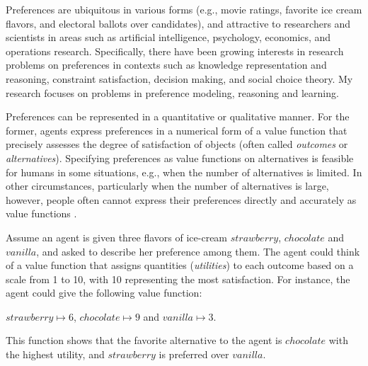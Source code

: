 Preferences are ubiquitous in various forms (e.g., movie ratings, 
favorite ice cream flavors, and electoral ballots over candidates),
and attractive to researchers and scientists in areas such as 
artificial intelligence, psychology, economics, and operations research.
Specifically, there have been growing interests in research problems on
preferences in contexts such as knowledge representation and reasoning, constraint 
satisfaction, decision making, and social choice theory. 
My research focuses on problems in preference modeling, 
reasoning and learning.

Preferences can be represented in a quantitative or qualitative manner.
For the former, agents express preferences in a numerical form of
a value function that precisely assesses the degree of satisfaction
of objects
(often called \textit{outcomes} or \textit{alternatives}).
Specifying preferences as value functions on alternatives
is feasible for humans in some situations, e.g., 
when the number of alternatives is limited.
In other circumstances, particularly when the number of alternatives is large, however,
people often cannot express their 
preferences directly and accurately as value 
functions \cite{Domshlak20111037}.

Assume an agent is given three flavors of ice-cream 
$strawberry$, $chocolate$ and $vanilla$, and asked to describe 
her preference among them.
The agent could think of a value function that
assigns quantities (\textit{utilities}) to each outcome
based on a scale from 1 to 10, with 10 representing the most satisfaction.
For instance, the agent could give the following value function:
\begin{center}
	$strawberry \mapsto 6$, $chocolate \mapsto 9$ and $vanilla \mapsto 3$.
\end{center}
This function shows that the favorite alternative to the agent is
$chocolate$ with the highest utility, and
$strawberry$ is preferred over $vanilla$.

